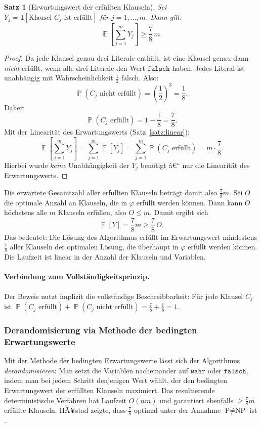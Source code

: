 ﻿\documentclass[12pt,a4paper]{article}
\theoremstyle{definition}
\theoremstyle{plain}
\newtheorem{satz}{Satz}[section]
\theoremstyle{remark}
\DeclareMathOperator{\E}{\mathbb{E}}
\DeclareMathOperator{\Prob}{\mathbb{P}}
\begin{document}
\begin{satz}[Erwartungswert der erfüllten Klauseln]\label{satz:ewsat}
  Sei $Y_j = \mathbf{1}[\text{Klausel } C_j \text{ ist erfüllt}]$ für
  $j = 1, \ldots, m$. Dann gilt:
  \[
    \E\!\left[\sum_{j=1}^m Y_j\right] \geq \frac{7}{8}\, m.
  \]
\end{satz}

\begin{proof}
  Da jede Klausel genau drei Literale enthält, ist eine Klausel genau dann
  \emph{nicht} erfüllt, wenn alle drei Literale den Wert $\mathtt{falsch}$
  haben. Jedes Literal ist unabhängig mit Wahrscheinlichkeit $\frac{1}{2}$
  falsch. Also:
  \[
    \Prob(C_j \text{ nicht erfüllt}) = \left(\frac{1}{2}\right)^{\!3} = \frac{1}{8}.
  \]
  Daher:
  \[
    \Prob(C_j \text{ erfüllt}) = 1 - \frac{1}{8} = \frac{7}{8}.
  \]
  Mit der Linearität des Erwartungswerts (Satz~\ref{satz:linear}):
  \[
    \E\!\left[\sum_{j=1}^m Y_j\right] = \sum_{j=1}^m \E[Y_j]
    = \sum_{j=1}^m \Prob(C_j \text{ erfüllt}) = m \cdot \frac{7}{8}.
  \]
  Hierbei wurde \emph{keine} Unabhängigkeit der $Y_j$ benötigt â€“ nur die
  Linearität des Erwartungswerts.
\end{proof}

Die erwartete Gesamtzahl aller erfüllten Klauseln beträgt damit also
$\frac{7}{8}m$. Sei $O$ die optimale Anzahl an Klauseln, die in $\varphi$
erfüllt werden können. Dann kann $O$ höchstens alle $m$ Klauseln erfüllen,
also $O \le m$. Damit ergibt sich
\[
  \E[Y] = \frac{7}{8}m \ge \frac{7}{8}\, O.
\]
Das bedeutet: Die Lösung des Algorithmus erfüllt im Erwartungswert mindestens
$\frac{7}{8}$ aller Klauseln der optimalen Lösung, die überhaupt in $\varphi$
erfüllt werden können. Die Laufzeit ist linear in der Anzahl der Klauseln
und Variablen.

\paragraph{Verbindung zum Vollständigkeitsprinzip.}
Der Beweis nutzt implizit die vollständige Beschreibbarkeit: Für jede Klausel
$C_j$ ist $\Prob(C_j \text{ erfüllt}) + \Prob(C_j \text{ nicht erfüllt})
= \frac{7}{8}+\frac{1}{8}=1$.

\subsubsection{Derandomisierung via Methode der bedingten Erwartungswerte}

Mit der Methode der bedingten Erwartungswerte \cite{alon2016probabilistic}
lässt sich der Algorithmus \emph{derandomisieren}: Man setzt die Variablen
nacheinander auf $\mathtt{wahr}$ oder $\mathtt{falsch}$, indem man bei
jedem Schritt denjenigen Wert wählt, der den bedingten Erwartungswert der
erfüllten Klauseln maximiert. Das resultierende deterministische Verfahren
hat Laufzeit $O(nm)$ und garantiert ebenfalls $\geq \frac{7}{8}m$ erfüllte
Klauseln. HÃ¥stad zeigte, dass $\frac{7}{8}$ optimal unter der Annahme
$\text{P} \neq \text{NP}$ ist \cite{hastad2001some}.
\end{document}

